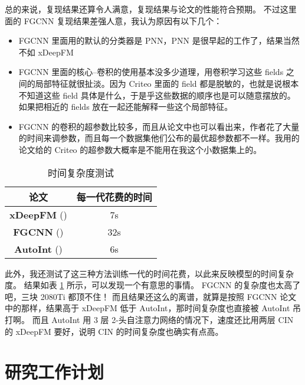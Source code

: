 \documentclass[degree=master,cjk-font=noto]{thuthesis}
\begin{document}
总的来说，复现结果还算令人满意，复现结果与论文的性能符合预期。
不过这里面的 FGCNN 复现结果差强人意，我认为原因有以下几个：

\begin{itemize}
  \item FGCNN 里面用的默认的分类器是 PNN，PNN 是很早起的工作了，结果当然不如 xDeepFM
  \item FGCNN 里面的核心--卷积的使用基本没多少道理，用卷积学习这些 fields 之间的局部特征就很扯淡。因为 Criteo 里面的 field 都是脱敏的，也就是说根本不知道这些 field 具体是什么，于是乎这些数据的顺序也是可以随意摆放的。如果把相近的 fields 放在一起还能解释一些这个局部特征。
  \item FGCNN 的卷积的超参数比较多，而且从论文中也可以看出来，作者花了大量的时间来调参数，而且每一个数据集他们公布的最优超参数都不一样。我用的论文给的 Criteo 的超参数大概率是不能用在我这个小数据集上的。
\end{itemize}

\begin{table}[htb]
  \centering
  \caption{时间复杂度测试}
  \label{tab:time_complex}
  \begin{tabular}{cc}
    \toprule
    \textbf{论文}         & \textbf{每一代花费的时间}  \\
    \midrule
    \textbf{xDeepFM} (\cite{xdeepfm}) & 7s \\
    \textbf{FGCNN} (\cite{fgcnn})           & 32s \\
    \textbf{AutoInt} (\cite{autoint})         & 6s \\
    \bottomrule
  \end{tabular}
\end{table}

此外，我还测试了这三种方法训练一代的时间花费，以此来反映模型的时间复杂度。
结果如表 \ref{tab:time_complex} 所示，可以发现一个有意思的事情。
FGCNN 的复杂度也太高了吧，三块 2080Ti 都顶不住！
而且结果还这么的离谱，就算是按照 FGCNN 论文中的那样，结果高于 xDeepFM 低于 AutoInt，那时间复杂度也直接被 AutoInt 吊打啊。
而且 AutoInt 用 3 层 2-头自注意力网络的情况下，速度还比用两层 CIN 的 xDeepFM 要好，说明 CIN 的时间复杂度也确实有点高。

\chapter{研究工作计划}
\end{document}
